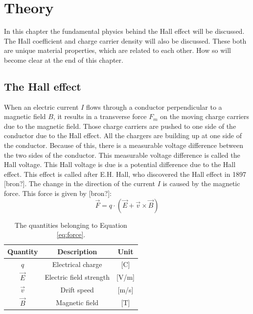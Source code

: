 \chapter{Theory}
In this chapter the fundamental physics behind the Hall effect will be discussed. The Hall coefficient and charge carrier density will also be discussed. These both are unique material properties, which are related to each other. How so will become clear at the end of this chapter.

\section{The Hall effect}
When an electric current $I$ flows through a conductor perpendicular to a magnetic field $B$, it results in a transverse force $F_m$ on the moving charge carriers due to the magnetic field. Those charge carriers are pushed to one side of the conductor due to the Hall effect. All the chargers are building up at one side of the conductor. Because of this, there is a measurable voltage difference between the two sides of the conductor. This measurable voltage difference is called the Hall voltage. This Hall voltage is due is a potential difference due to the Hall effect. This effect is called after E.H. Hall, who discovered the Hall effect in 1897 [bron?]. The change in the direction of the current $I$ is caused by the magnetic force. This force is given by [bron?]:
    \begin{equation}
        \vec F = q\cdot (\vec E + \vec v \times \vec B)
        \label{eq:force}
    \end{equation}
%   
    \begin{table}[!htbp]
    \centering
    \caption{The quantities belonging to Equation \ref{eq:force}.}
    \label{table:force}
    \begin{tabular}{|c|c|c|}
    \hline
    \textbf{Quantity}   & \textbf{Description}           & \textbf{Unit}            \\ \hline
    $q$                  & Electrical charge    & {[}C{]}                     \\ \hline
    $\vec E$                  & Electric field strength         & {[}V/m{]}                     \\ \hline
    $\vec v$                  & Drift speed           & {[}m/s{]}                     \\ \hline
    $\vec B$                  & Magnetic field & {[}T{]} \\ \hline
    \end{tabular}
    \end{table}
